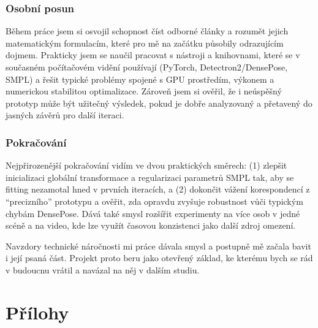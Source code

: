 \documentclass[11pt,a4paper,twoside,openright]{report}
\let\openright=\cleardoublepage
\begin{document}
\section{Osobní posun}

Během práce jsem si osvojil schopnost číst odborné články a rozumět jejich matematickým formulacím, které pro mě na začátku působily odrazujícím dojmem. Prakticky jsem se naučil pracovat s nástroji a knihovnami, které se v současném počítačovém vidění používají (PyTorch, Detectron2/DensePose, SMPL) a řešit typické problémy spojené s GPU prostředím, výkonem a numerickou stabilitou optimalizace. Zároveň jsem si ověřil, že i neúspěšný prototyp může být užitečný výsledek, pokud je dobře analyzovaný a přetavený do jasných závěrů pro další iteraci.

\section{Pokračování}

Nejpřirozenější pokračování vidím ve dvou praktických směrech: (1) zlepšit inicializaci globální transformace a regularizaci parametrů SMPL tak, aby se fitting nezamotal hned v prvních iteracích, a (2) dokončit vážení korespondencí z \enquote{precizního} prototypu a ověřit, zda opravdu zvyšuje robustnost vůči typickým chybám DensePose. Dává také smysl rozšířit experimenty na více osob v jedné scéně a na video, kde lze využít časovou konzistenci jako další zdroj omezení.

Navzdory technické náročnosti mi práce dávala smysl a postupně mě začala bavit i její psaná část. Projekt proto beru jako otevřený základ, ke kterému bych se rád v budoucnu vrátil a navázal na něj v dalším studiu.



\printbibliography[title={Seznam použité literatury},heading={bibintoc}]

\openright
\listoffigures
{}



\clearpage
\part*{Přílohy}
\appendix
\end{document}
